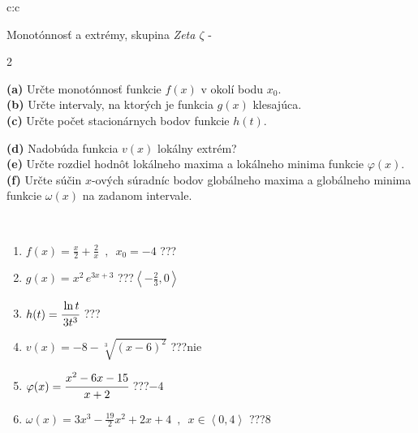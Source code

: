 \documentclass[10pt]{report}
\begin{document}
\newpage
\thispagestyle{empty}
\begin{tabular}{c:c}
\begin{minipage}[c][104.5mm][t]{0.5\linewidth}
\begin{center}
\vspace{7mm}
{\huge Monotónnosť a extrémy, skupina \textit{Zeta $\zeta$} -}\\[5mm]
\begin{minipage}{0.95\linewidth}
\begin{center}
{\small \begin{multicols}{2} \raggedright
\textbf{(a)} Určte monotónnosť funkcie \(f(x)\) v okolí bodu \(x_0\). \\[1mm]
\textbf{(b)} Určte intervaly, na ktorých je funkcia \(g(x)\) klesajúca. \\[1mm]
\textbf{(c)} Určte počet stacionárnych bodov funkcie \(h(t)\). \par \columnbreak
\textbf{(d)} Nadobúda funkcia \(v(x)\) lokálny extrém? \\[1mm]
\textbf{(e)} Určte rozdiel hodnôt lokálneho maxima a lokálneho minima funkcie \(\varphi(x)\). \\[1mm]
\textbf{(f)} Určte súčin \(x\)-ových súradníc bodov globálneho maxima a globálneho minima funkcie \(\omega(x)\) na zadanom intervale. \\[1mm]
\end{multicols}
}
\end{center}
\end{minipage}
\\[4mm]
\begin{minipage}{0.79\linewidth}
\begin{center}
\begin{varwidth}{\linewidth}
\begin{enumerate}
\normalsize
\item $f(x)=\frac{x}{2}+\frac{2}{x} \enspace , \enspace x_0=-4$\quad \dotfill\; ???\;\dotfill \quad {}
\item $g(x)=x^2\, e^{3x+3}$\quad \dotfill\; ???\;\dotfill \quad $\left\langle-\frac{2}{3} , 0\right\rangle$
\item $h(t)=\cfrac{\ln t}{3t^3}$\quad \dotfill\; ???\;\dotfill {}
\item $v(x)=-8-\sqrt[3]{(x-6)^2}$\quad \dotfill\; ???\;\dotfill \quad $\text{nie}$
\item $\varphi(x)=\cfrac{x^2-6x-15}{x+2}$\quad \dotfill\; ???\;\dotfill \quad $-4$
\item $\omega(x)=3x^3-\frac{19}{2}x^2+2x+4 \enspace , \enspace x\in\left\langle0 , 4\right\rangle$\quad \dotfill\; ???\;\dotfill \quad $8$

\end{enumerate}
\end{varwidth}
\end{center}
\end{minipage}
\end{center}
\end{minipage}
\end{tabular}
\end{document}
